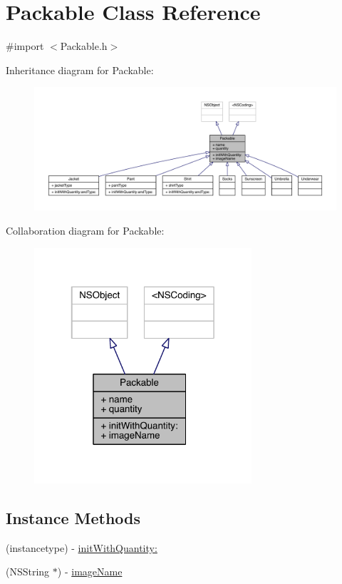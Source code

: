 \hypertarget{interface_packable}{\section{Packable Class Reference}
\label{interface_packable}
}


{\ttfamily \#import $<$Packable.\-h$>$}



Inheritance diagram for Packable\-:\nopagebreak
\begin{figure}[H]
\begin{center}
\leavevmode
\includegraphics[width=350pt]{interface_packable__inherit__graph}
\end{center}
\end{figure}


Collaboration diagram for Packable\-:\nopagebreak
\begin{figure}[H]
\begin{center}
\leavevmode
\includegraphics[width=229pt]{interface_packable__coll__graph}
\end{center}
\end{figure}
\subsection*{Instance Methods}
\begin{DoxyCompactItemize}
\item 
(instancetype) -\/ \hyperlink{interface_packable_a30cc46d60486a458893971e597b9caac}{init\-With\-Quantity\-:}
\item 
(N\-S\-String $\ast$) -\/ \hyperlink{interface_packable_a4fbf7a673f6fed8f49dad635209cfc8d}{image\-Name}
\end{DoxyCompactItemize}
